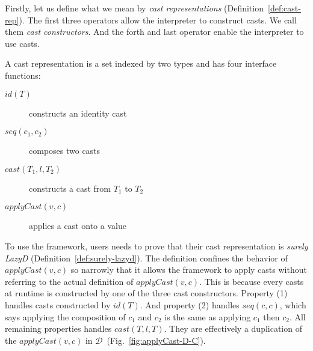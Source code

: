 \documentclass[acmsmall,review,anonymous]{acmart}\settopmatter{printfolios=true,printccs=false,printacmref=false}
\newcommand{\ineffCEKD}{$ \mathcal{D} $}
\begin{document}
Firstly, let us define what we mean by \emph{cast representations} 
(Definition~\ref{def:cast-rep}). The first three operators allow the 
interpreter to construct casts. We call them \textit{cast constructors}. 
And the forth and last operator enable the interpreter to use casts.

\begin{definition}
	\label{def:cast-rep}
	A cast representation is a set indexed by two types and has four interface 
	functions:
	\begin{description}
		\item[$ id(T) $] constructs an identity cast
		\item[$ seq(c_1,c_2) $] composes two casts
		\item[$ cast(T_1,l,T_2) $] constructs a cast from $ T_1 $ to $ T_2 $
		\item[$ applyCast(v,c) $] applies a cast onto a value
	\end{description}
\end{definition}

To use the framework, users needs to prove that their cast representation is 
\emph{surely LazyD} (Definition~\ref{def:surely-lazyd}).
The definition confines the behavior of $ applyCast(v,c) $ so narrowly that it 
allows the framework to apply casts without referring to the actual definition 
of $ applyCast(v,c) $. This 
is because every casts at runtime is constructed by one of 
the three cast constructors. 
Property (1) handles casts constructed by $ id(T) $. 
And property (2) handles $ seq(c,c) $, which says applying the 
composition of $ c_1 $ and $ c_2 $ is the same as applying $ c_1 $ then $ c_2 $.
All remaining properties handles $ cast(T,l,T) $. They are effectively a 
duplication of the $ applyCast(v,c) $ in \ineffCEKD\ 
(Fig.~\ref{fig:applyCast-D-C}).
\end{document}
